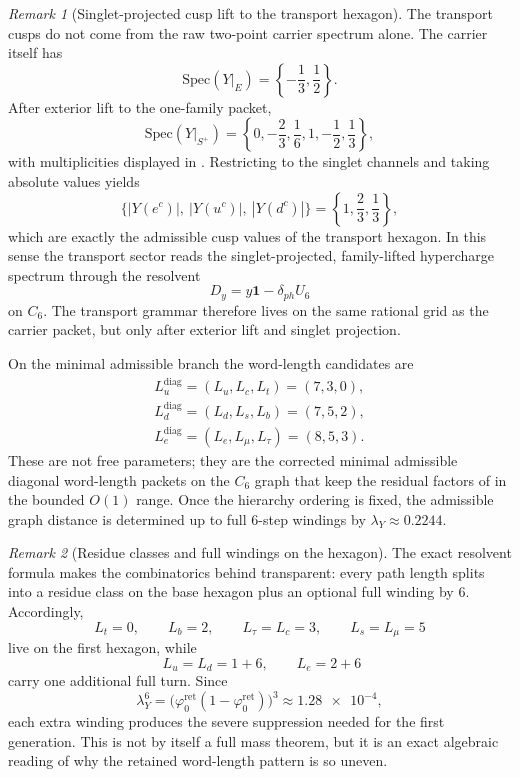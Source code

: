 \documentclass[11pt,a4paper]{article}
\theoremstyle{definition}
\theoremstyle{remark}
\newtheorem*{remark}{Remark}
\newcommand{\phiz}{\varphi_0^{\mathrm{ret}}}
\newcommand{\lambdaY}{\lambda_Y}
\begin{document}
\begin{remark}[Singlet-projected cusp lift to the transport hexagon]
The transport cusps do not come from the raw two-point carrier spectrum alone. The carrier itself has
\[
\mathrm{Spec}(Y|_E)=\left\{-\frac13,\frac12\right\}.
\]
After exterior lift to the one-family packet,
\[
\mathrm{Spec}(Y|_{S^+})
=
\left\{0,-\frac23,\frac16,1,-\frac12,\frac13\right\},
\]
with multiplicities displayed in . Restricting to the singlet channels and taking absolute values yields
\[
\{|Y(e^c)|,\ |Y(u^c)|,\ |Y(d^c)|\}
=
\left\{1,\frac23,\frac13\right\},
\]
which are exactly the admissible cusp values of the transport hexagon. In this sense the transport sector reads the singlet-projected, family-lifted hypercharge spectrum through the resolvent
\[
D_y=y\mathbf 1-\delta_{ph}U_6
\]
on $C_6$. The transport grammar therefore lives on the same rational grid as the carrier packet, but only after exterior lift and singlet projection.
\end{remark}

On the minimal admissible branch the word-length candidates are
\begin{equation}
\label{eq:minimal-word-lengths}
\begin{gathered}
L_u^{\mathrm{diag}}=(L_u,L_c,L_t)=(7,3,0),\\
L_d^{\mathrm{diag}}=(L_d,L_s,L_b)=(7,5,2),\\
L_e^{\mathrm{diag}}=(L_e,L_\mu,L_\tau)=(8,5,3).
\end{gathered}
\end{equation}
These are not free parameters; they are the corrected minimal admissible diagonal word-length packets on the $C_6$ graph that keep the residual factors of  in the bounded $O(1)$ range. Once the hierarchy ordering is fixed, the admissible graph distance is determined up to full $6$-step windings by $\lambdaY\approx\num{0.2244}$.

\begin{remark}[Residue classes and full windings on the hexagon]
The exact resolvent formula  makes the combinatorics behind  transparent: every path length splits into a residue class on the base hexagon plus an optional full winding by $6$. Accordingly,
\[
L_t=0,\qquad
L_b=2,\qquad
L_\tau=L_c=3,\qquad
L_s=L_\mu=5
\]
live on the first hexagon, while
\[
\;L_u=L_d=1+6,
\qquad
L_e=2+6
\]
carry one additional full turn. Since
\[
\lambda_Y^6=\bigl(\phiz(1-\phiz)\bigr)^3\approx \num{1.28e-4},
\]
each extra winding produces the severe suppression needed for the first generation. This is not by itself a full mass theorem, but it is an exact algebraic reading of why the retained word-length pattern is so uneven.
\end{remark}
\end{document}

